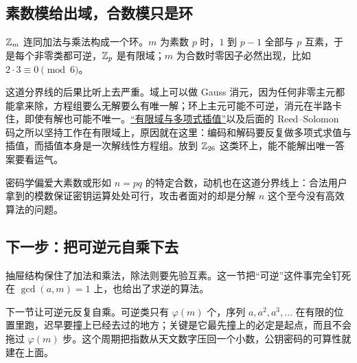 \subsection{素数模给出域，合数模只是环}

\(\mathbb{Z}_m\) 连同加法与乘法构成一个环。\(m\) 为素数 \(p\) 时，\(1\) 到 \(p-1\) 全部与 \(p\) 互素，于是每个非零类都可逆，\(\mathbb{Z}_p\) 是有限域；\(m\) 为合数时零因子必然出现，比如 \(2\cdot3\equiv0\pmod6\)。

这道分界线的后果比听上去严重。域上可以做 Gauss 消元，因为任何非零主元都能拿来除，方程组要么无解要么有唯一解；环上主元可能不可逆，消元在半路卡住，即使有解也可能不唯一。\hyperref[sec:04-Discrete-Mathematics/05-Coding-and-Polynomial-Methods/01]{``有限域与多项式插值''}以及后面的 Reed--Solomon 码之所以坚持工作在有限域上，原因就在这里：编码和解码要反复做多项式求值与插值，而插值本身是一次解线性方程组。放到 \(\mathbb{Z}_{26}\) 这类环上，能不能解出唯一答案要看运气。

密码学偏爱大素数或形如 \(n=pq\) 的特定合数，动机也在这道分界线上：合法用户拿到的模数保证密钥运算处处可行，攻击者面对的却是分解 \(n\) 这个至今没有高效算法的问题。

\subsection{下一步：把可逆元自乘下去}

抽屉结构保住了加法和乘法，除法则要先验互素。这一节把``可逆''这件事完全钉死在 \(\gcd(a,m)=1\) 上，也给出了求逆的算法。

下一节让可逆元反复自乘。可逆类只有 \(\varphi(m)\) 个，序列 \(a,a^2,a^3,\dots\) 在有限的位置里跑，迟早要撞上已经去过的地方；关键是它最先撞上的必定是起点，而且不会拖过 \(\varphi(m)\) 步。这个周期把指数从天文数字压回一个小数，公钥密码的可算性就建在上面。
